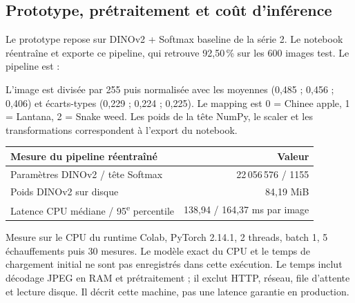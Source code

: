 \documentclass[10pt,a4paper]{article}
\newcommand{\pct}{\,\%\xspace}
\begin{document}
\subsection{Prototype, prétraitement et coût d'inférence}
Le prototype repose sur DINOv2 + Softmax baseline de la série 2. Le notebook réentraîne
et exporte ce pipeline, qui retrouve 92,50\pct sur les 600 images test. Le pipeline est :
\begin{center}\small
{}\end{center}
L'image est divisée par 255 puis normalisée avec les moyennes (0,485 ; 0,456 ; 0,406) et
écarts-types (0,229 ; 0,224 ; 0,225). Le mapping est 0 = Chinee apple, 1 = Lantana, 2 = Snake weed.
Les poids de la tête NumPy, le scaler et les transformations correspondent à l'export du notebook.
\begin{center}\small
\begin{tabular}{lr}\toprule
Mesure du pipeline réentraîné & Valeur\\\midrule
Paramètres DINOv2 / tête Softmax & 22\,056\,576 / 1155\\
Poids DINOv2 sur disque & 84,19 MiB\\
Latence CPU médiane / 95\textsuperscript{e} percentile & 138,94 / 164,37 ms par image\\
\bottomrule\end{tabular}
\end{center}
Mesure sur le CPU du runtime Colab, PyTorch 2.14.1, 2 threads, batch 1, 5 échauffements
puis 30 mesures. Le modèle exact du CPU et le temps de chargement initial ne sont pas
enregistrés dans cette exécution. Le temps inclut décodage JPEG en RAM et prétraitement ; il exclut HTTP, réseau,
file d'attente et lecture disque. Il décrit cette machine, pas une latence garantie en production.
\end{document}
